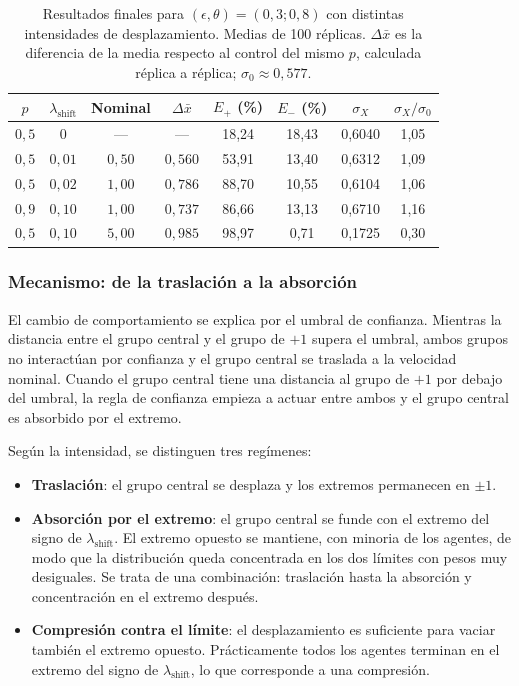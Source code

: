 \documentclass[11pt,a4paper]{article}
\begin{document}
\begin{table}[htbp]
\centering
\caption{Resultados finales para $(\epsilon,\theta)=(0{,}3;0{,}8)$ con distintas intensidades de desplazamiento. Medias de 100 réplicas. $\Delta\bar{x}$ es la diferencia de la media respecto al control del mismo $p$, calculada réplica a réplica; $\sigma_0\approx0{,}577$.}
\label{tab:shift-intensidad}
\begin{tabular}{cccccccc}
\toprule
$p$ & $\lambda_{\mathrm{shift}}$ & Nominal & $\Delta\bar{x}$ & $E_{+}$ (\%) & $E_{-}$ (\%) & $\sigma_X$ & $\sigma_X/\sigma_0$ \\
\midrule
$0{,}5$ & $0$        & ---      & ---     & 18,24 & 18,43 & 0,6040 & 1,05 \\
$0{,}5$ & $0{,}01$   & $0{,}50$ & $0{,}560$ & 53,91 & 13,40 & 0,6312 & 1,09 \\
$0{,}5$ & $0{,}02$   & $1{,}00$ & $0{,}786$ & 88,70 & 10,55 & 0,6104 & 1,06 \\
$0{,}9$ & $0{,}10$   & $1{,}00$ & $0{,}737$ & 86,66 & 13,13 & 0,6710 & 1,16 \\
$0{,}5$ & $0{,}10$   & $5{,}00$ & $0{,}985$ & 98,97 & 0,71  & 0,1725 & 0,30 \\
\bottomrule
\end{tabular}
\end{table}

\subsubsection{Mecanismo: de la traslación a la absorción}
\label{sec:shift-intensidad-mecanismo}

El cambio de comportamiento se explica por el umbral de confianza. Mientras la distancia entre el grupo central y el grupo de $+1$ supera el umbral, ambos grupos no interactúan por confianza y el grupo central se traslada a la velocidad nominal. Cuando el grupo central tiene una distancia al grupo de $+1$ por debajo del umbral, la regla de confianza empieza a actuar entre ambos y el grupo central es absorbido por el extremo.

Según la intensidad, se distinguen tres regímenes:
\begin{itemize}
    \item \textbf{Traslación}: el grupo central se desplaza y los extremos permanecen en $\pm1$.
    \item \textbf{Absorción por el extremo}: el grupo central se funde con el extremo del signo de $\lambda_{\mathrm{shift}}$. El extremo opuesto se mantiene, con minoria de los agentes, de modo que la distribución queda concentrada en los dos límites con pesos muy desiguales. Se trata de una combinación: traslación hasta la absorción y concentración en el extremo después.
    \item \textbf{Compresión contra el límite}: el desplazamiento es suficiente para vaciar también el extremo opuesto. Prácticamente todos los agentes terminan en el extremo del signo de $\lambda_{\mathrm{shift}}$, lo que corresponde a una compresión.
\end{itemize}
\end{document}

